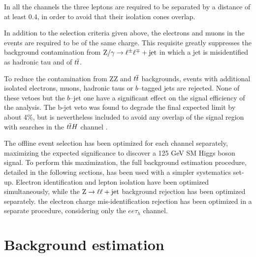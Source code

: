 In all the channels the three leptons are required to be separated by a \DR distance of at least 0.4, in order to avoid that their isolation cones overlap.

In addition to the selection criteria given above, the electrons and muons in the events are required to be of the same charge. This requisite greatly suppresses the background contamination from $\mathrm{Z}/\gamma \to \ell^\pm \ell^\mp + \mathrm{jet}$ in which a jet is misidentified as hadronic tau and of $t\overline{t}$.

To reduce the contamination from ZZ and $t\overline{t}$ backgrounds, events with additional isolated electrons, muons, hadronic taus or $b$--tagged jets are rejected. None of these vetoes but the $b$--jet one
have a significant effect on the signal efficiency of the analysis. The b-jet veto was found to degrade the final expected limit by about 4\%, but is nevertheless included to avoid any overlap of the
signal region with searches in the $t\overline{t}H$ channel \cite{CMS-PAS-HIG-13-019}.

The offline event selection has been optimized for each channel separately, maximizing the expected significance to discover a 125 GeV SM Higgs boson signal. To perform this maximization, the full background estimation procedure, detailed in the following sections, has been used with a simpler systematics set-up. Electron identification and lepton isolation have been optimized simultaneously, while the $\mathrm{Z}\rightarrow\ell\ell+\mathrm{jet}$ background rejection has been optimized separately. the electron charge mis-identification rejection has been optimized in a separate procedure, considering only the $ee\tau_h$ channel.

\section{Background estimation}

